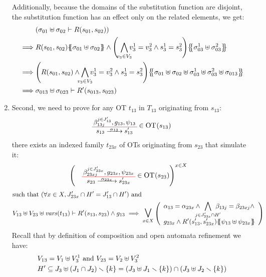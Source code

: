\documentclass[runningheads]{llncs}
\begin{document}
\begin{enumerate}
Additionally, because  the domains of the substitution function are disjoint, the substitution function has an effect only on the related elements,  we get:
\begin{align*}
& \mpar{\sigma_{01} \uplus \sigma_{02} \vdash R\mpar{s_{01}, s_{02}}} 
\\
\implies & R\mpar{s_{01}, s_{02}}\psubst{ \sigma_{01} \uplus \sigma_{02}}  \land \mpar{\,\,\bigwedge_\subbox{v_3\in V_3} v^1_3=v^2_3\wedge s^1_3 = s^2_3}\psubst{\sigma_{03}^1 \uplus \sigma_{03}^2 }\\
\implies & \mpar{R\mpar{s_{01}, s_{02}} \wedge  \bigwedge_\subbox{v_3\in V_3}  v^1_3=v^2_3\wedge s^1_3 = s^2_3} \psubst{ \sigma_{01} \uplus \sigma_{02} \uplus \sigma^1_{03}\uplus \sigma^2_{03}\uplus \sigma_{013} }\\
\implies & \sigma_{013} \uplus \sigma_{023} \vdash R'\mpar{s_{013}, s_{023}}
\end{align*}
\item Second, we need to prove for any OT $t_{13}$ in $T_{13}$ originating from $s_{13}$:
\begin{align*}
		&  \OTx{13}{}{13}{13} \in \fOT{s_{13}}
\end{align*}		
there exists an indexed family $t_{23x}$ of OTs originating from $s_{23}$ that simulate it: 
\begin{align*}
		&  \mpar{\OTx{23}{x}{23x}{23x} \in \fOT{s_{23}}}^{x \in X}
\end{align*}	
\begin{align*}		
		& \text{such that } \mpar{\forall x \in X, J'_{23x} \cap H' = J'_{13} \cap H'} \text{ and }\\
		&  V_{13} \uplus V_{23} \uplus \fvars{t_{13}} \vdash R'\mpar{s_{13}, s_{23}} \wedge g_{13} \implies \operatorname*{\bigsymb{\bigvee}}_{x \in X} \mpar{\everymath{\displaystyle}\begin{array}{l}
			\alpha_{13} = \alpha_{23x} \wedge \bigwedge_\subbox{j \in J'_{23x} \cap H'} \beta_{13j} = \beta_{23xj} \wedge\\[12pt]
			 g_{23x} \wedge R'\mpar{s'_{13}, s'_{23x}}\psubst{\psi_{13} \uplus \psi_{23x}}
		\end{array}} 
	\end{align*}
Recall that by definition of composition and open automata refinement we have: 
\begin{align*}
&V_{13}= V_1\uplus V^1_3 \text{ and }
V_{23}= V_2\uplus V^2_3\\
& H' \subseteq J_3\uplus \mpar{J_1 \cap J_2} \setminus \{k\} = \mpar{J_3\uplus J_1 \setminus \{k\} } \cap \mpar{J_3\uplus J_2 \setminus \{k\}} \\

\end{align*}
\end{enumerate}
\end{document}
